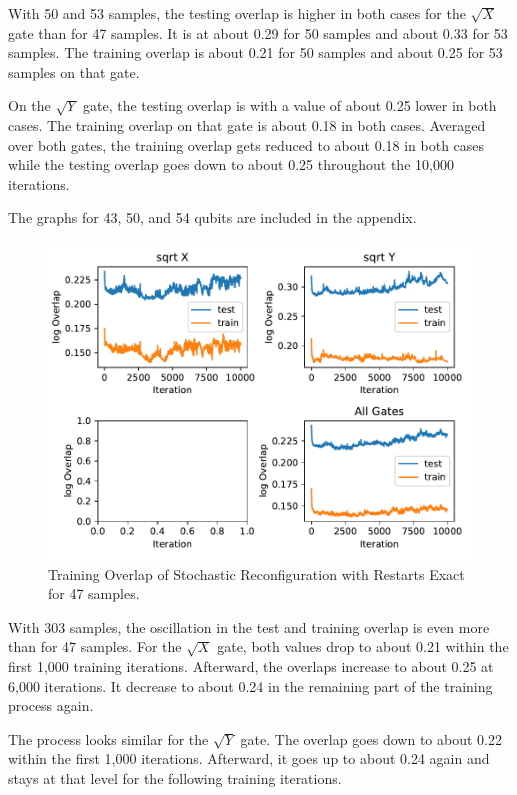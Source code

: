 With 50 and 53 samples, the testing overlap is higher in both cases for the $\sqrt{X}$ gate than for 
47 samples. It is at about 0.29 for 50 samples and about 0.33 for 53 samples. The training overlap is about 
0.21 for 50 samples and about 0.25 for 53 samples on that gate.

On the $\sqrt{Y}$ gate, the testing overlap is with a value of about 0.25 lower in both cases. The 
training overlap on that gate is about 0.18 in both cases. Averaged over both gates, the training 
overlap gets reduced to about 0.18 in both cases while the testing overlap goes down to about 0.25 
throughout the 10,000 iterations.

The graphs for 43, 50, and 54 qubits are included in the appendix.

\begin{figure}[H]
  \centering
  \includegraphics[width=\textwidth]{figures/results/SR-restarts-not-learned/avgOverlap_47.pdf}
  \caption[Training Overlap of Stochastic Reconfiguration with Restarts Exact]{Training 
  Overlap of Stochastic Reconfiguration with Restarts Exact for 47 samples.}
  \label{fig:sr_exact_overlap_47}
\end{figure}

With 303 samples, the oscillation in the test and training overlap is even more than for 47 samples. 
For the $\sqrt{X}$ gate, both values drop to about 0.21 within the first 1,000 training iterations. 
Afterward, the overlaps increase to about 0.25 at 6,000 iterations. It decrease to about 0.24 in the 
remaining part of the training process again.

The process looks similar for the $\sqrt{Y}$ gate. The overlap goes down to about 0.22 within the 
first 1,000 iterations. Afterward, it goes up to about 0.24 again and stays at that level for the 
following training iterations.

